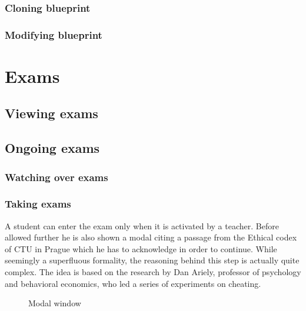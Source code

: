 \documentclass[thesis=M,english,hidelinks]{FITthesis}[2012/10/20]
\begin{document}
    \subsubsection{Cloning blueprint}

    \subsubsection{Modifying blueprint}

  \section{Exams}

    \subsection{Viewing exams}

    \subsection{Ongoing exams}

      \subsubsection{Watching over exams}

      \subsubsection{Taking exams}

A student can enter the exam only when it is activated by a teacher. Before allowed further he is also shown a modal citing a passage from the Ethical codex of CTU in Prague which he has to acknowledge in order to continue. While seemingly a superfluous formality, the reasoning behind this step is actually quite complex. The idea is based on the research by Dan Ariely, professor of psychology and behavioral economics, who led a series of experiments on cheating.

\begin{figure}[h]
  \setlength\fboxsep{0pt}
  \setlength\fboxrule{0.2pt}
  \caption{Modal window}
  \label{fig:ethical-codex}
\end{figure}
\end{document}
